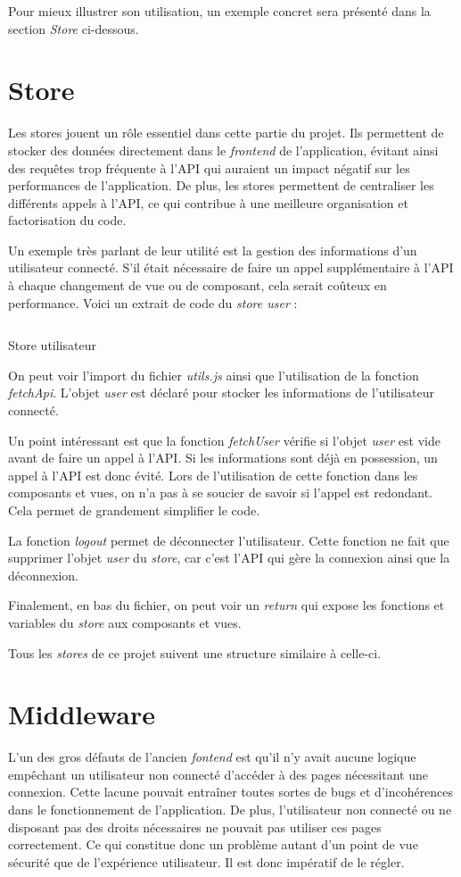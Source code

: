 Pour mieux illustrer son utilisation, un exemple concret sera présenté dans la section \emph{Store} ci-dessous.

\section{Store}
Les stores jouent un rôle essentiel dans cette partie du projet. Ils permettent de stocker des données directement dans le \emph{frontend} de l'application, évitant ainsi des requêtes trop fréquente à l'API qui auraient un impact négatif sur les performances de l'application. De plus, les stores permettent de centraliser les différents appels à l'API, ce qui contribue à une meilleure organisation et factorisation du code.

Un exemple très parlant de leur utilité est la gestion des informations d'un utilisateur connecté. S'il était nécessaire de faire un appel supplémentaire à l'API à chaque changement de vue ou de composant, cela serait coûteux en performance.
Voici un extrait de code du \emph{store user} :

\begin{listing}[H]
    \inputminted{js}{assets/code/userStore.js}
    \caption{Store utilisateur}
\end{listing}

On peut voir l'import du fichier \emph{utils.js} ainsi que l'utilisation de la fonction \emph{fetchApi}.
L'objet \emph{user} est déclaré pour stocker les informations de l'utilisateur connecté.

Un point intéressant est que la fonction \emph{fetchUser} vérifie si l'objet \emph{user} est vide avant de faire un appel à l'API. Si les informations sont déjà en possession, un appel à l'API est donc évité. Lors de l'utilisation de cette fonction dans les composants et vues, on n'a pas à se soucier de savoir si l'appel est redondant. Cela permet de grandement simplifier le code.

La fonction \emph{logout} permet de déconnecter l'utilisateur. Cette fonction ne fait que supprimer l'objet \emph{user} du \emph{store}, car c'est l'API qui gère la connexion ainsi que la déconnexion.

Finalement, en bas du fichier, on peut voir un \emph{return} qui expose les fonctions et variables du \emph{store} aux composants et vues.

Tous les \emph{stores} de ce projet suivent une structure similaire à celle-ci.

\section{Middleware}
L'un des gros défauts de l'ancien \emph{fontend} est qu'il n'y avait aucune logique empêchant un utilisateur non connecté d'accéder à des pages nécessitant une connexion. Cette lacune pouvait entraîner toutes sortes de bugs et d'incohérences dans le fonctionnement de l'application. De plus, l'utilisateur non connecté ou ne disposant pas des droits nécessaires ne pouvait pas utiliser ces pages correctement. Ce qui constitue donc un problème autant d'un point de vue sécurité que de l'expérience utilisateur. Il est donc impératif de le régler.

